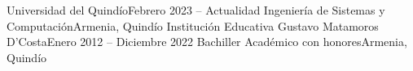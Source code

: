 \resumeSubHeadingListStart
    \resumeSubheading
        {Universidad del Quindío}{Febrero 2023 -- Actualidad}
        {Ingeniería de Sistemas y Computación}{Armenia, Quindío}
    \resumeSubheading
        {Institución Educativa Gustavo Matamoros D'Costa}{Enero 2012 -- Diciembre 2022}
        {Bachiller Académico con honores}{Armenia, Quindío}
\resumeSubHeadingListEnd
